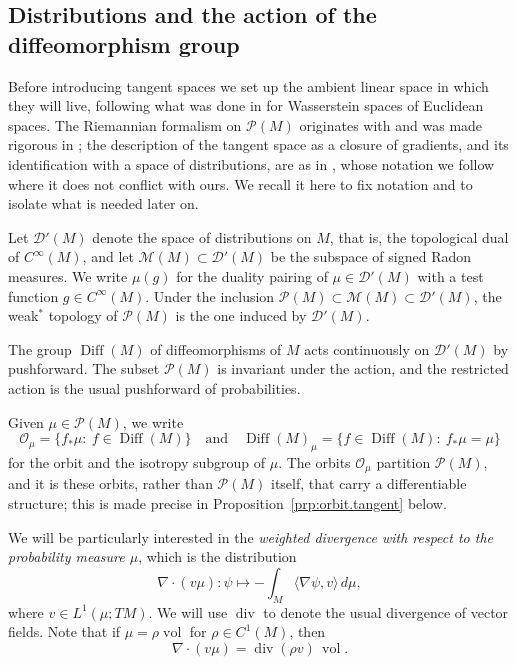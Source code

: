 \documentclass[11pt,reqno]{amsart}
\theoremstyle{plain}
\theoremstyle{definition}
\newcommand{\Prob}{\mathcal{P}}
\newcommand{\Dist}{\mathcal{D}'}
\DeclareMathOperator{\vol}{vol}
\DeclareMathOperator{\Div}{div}
\begin{document}
\subsection{Distributions and the action of the diffeomorphism group}
\label{sec:distributional}

Before introducing tangent spaces we set up the ambient linear space in which they will live, following what was done in \cite{gangbo_differential_2011} for Wasserstein spaces of Euclidean spaces.
The Riemannian formalism on \( \Prob(M) \) originates with \cite{otto_geometry_2001} and was made rigorous in \cite{lott_ricci_2009}; the description of the tangent space as a closure of gradients, and its identification with a space of distributions, are as in \cite[\S2--3]{gomes_differential_2024}, whose notation we follow where it does not conflict with ours.
We recall it here to fix notation and to isolate what is needed later on.

Let \( \Dist(M) \) denote the space of distributions on \( M \), that is, the topological dual of \( C^\infty(M) \), and let \( \mathcal M(M)\subset\Dist(M) \) be the subspace of signed Radon measures.
We write \( \mu(g) \) for the duality pairing of \( \mu\in\Dist(M) \) with a test function \( g\in C^\infty(M) \).
Under the inclusion \( \Prob(M)\subset\mathcal M(M)\subset\Dist(M) \), the weak\( ^\ast \) topology of \( \Prob(M) \) is the one induced by \( \Dist(M) \).

The group \( \operatorname{Diff}(M) \) of diffeomorphisms of \( M \) acts continuously on \( \Dist(M) \) by pushforward.
The subset \( \Prob(M) \) is invariant under the action, and the restricted action is the usual pushforward of probabilities.

Given \( \mu\in\Prob(M) \), we write
\[
    \mathcal O_\mu=\{f_\ast\mu:\ f\in\operatorname{Diff}(M)\}
    \quad\textrm{and}\quad
    \operatorname{Diff}(M)_\mu=\{f\in\operatorname{Diff}(M):\ f_\ast\mu=\mu\}
\]
for the orbit and the isotropy subgroup of \( \mu \).
The orbits \( \mathcal O_\mu \) partition \( \Prob(M) \), and it is these orbits, rather than \( \Prob(M) \) itself, that carry a differentiable structure; this is made precise in Proposition~\ref{prp:orbit.tangent} below.

We will be particularly interested in the \emph{weighted divergence with respect to the probability measure \( \mu \)}, which is the distribution
\[
    \nabla\!\cdot(v\mu):\psi\longmapsto-\int_M\langle\nabla\psi,v\rangle\,d\mu,
\]
where \(v\in L^1(\mu;TM)\).
We will use \(\Div\) to denote the usual divergence of vector fields.
Note that if \(\mu = \rho\vol \) for \(\rho \in C^1(M)\), then
\begin{equation}\label{eq:divergence.equivariance}
    \nabla\!\cdot(v\mu)=\Div(\rho v)\,\vol.
\end{equation}
\end{document}

